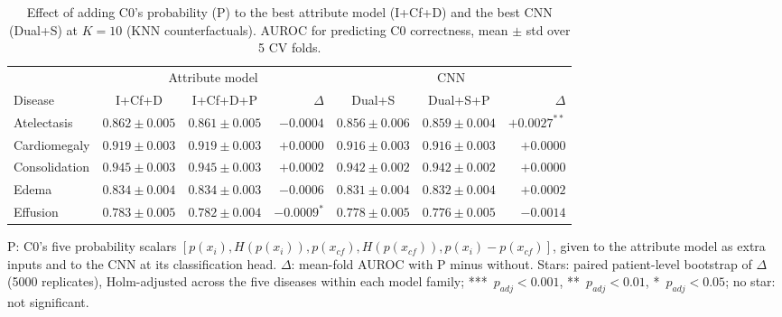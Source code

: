 \begin{table}[htbp]
\centering
\small
\caption{Effect of adding C0's probability (P) to the best attribute model (I+Cf+D) and the best CNN (Dual+S) at $K=10$ (KNN counterfactuals). AUROC for predicting C0 correctness, mean $\pm$ std over 5 CV folds.}
\label{tab:prob_knn}
\begin{threeparttable}
\begin{tabular}{lccr|ccr}
\toprule
\multicolumn{1}{c}{} & \multicolumn{3}{c|}{Attribute model} & \multicolumn{3}{c}{CNN} \\
\cmidrule(lr){2-4} \cmidrule(l){5-7}
Disease & I+Cf+D & I+Cf+D+P & $\Delta$ & Dual+S & Dual+S+P & $\Delta$ \\
\midrule
Atelectasis & $0.862 \pm 0.005$ & $0.861 \pm 0.005$ & $-0.0004$ & $0.856 \pm 0.006$ & $0.859 \pm 0.004$ & $+0.0027^{**}$ \\
Cardiomegaly & $0.919 \pm 0.003$ & $0.919 \pm 0.003$ & $+0.0000$ & $0.916 \pm 0.003$ & $0.916 \pm 0.003$ & $+0.0000$ \\
Consolidation & $0.945 \pm 0.003$ & $0.945 \pm 0.003$ & $+0.0002$ & $0.942 \pm 0.002$ & $0.942 \pm 0.002$ & $+0.0000$ \\
Edema & $0.834 \pm 0.004$ & $0.834 \pm 0.003$ & $-0.0006$ & $0.831 \pm 0.004$ & $0.832 \pm 0.004$ & $+0.0002$ \\
Effusion & $0.783 \pm 0.005$ & $0.782 \pm 0.004$ & $-0.0009^{*}$ & $0.778 \pm 0.005$ & $0.776 \pm 0.005$ & $-0.0014$ \\
\bottomrule
\end{tabular}
\begin{tablenotes}\footnotesize
\item P: C0's five probability scalars $[p(x_i), H(p(x_i)), p(x_{cf}), H(p(x_{cf})), p(x_i) - p(x_{cf})]$, given to the attribute model as extra inputs and to the CNN at its classification head. $\Delta$: mean-fold AUROC with P minus without. Stars: paired patient-level bootstrap of $\Delta$ (5000 replicates), Holm-adjusted across the five diseases within each model family; ***~$p_{adj} < 0.001$, **~$p_{adj} < 0.01$, *~$p_{adj} < 0.05$; no star: not significant.
\end{tablenotes}
\end{threeparttable}
\end{table}

